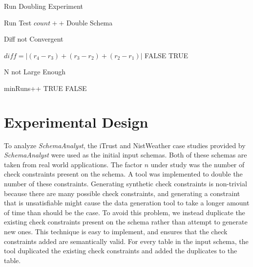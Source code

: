 \documentclass{sig-alternate}
\begin{document}
\begin{algorithm}[t]
    \caption{Run Doubling Experiment}
    \begin{algorithmic}
        \STATE Run Test
        \STATE $\mathit{count}++$
        \ENDFOR
        \STATE Double Schema
        \ENDWHILE
    \end{algorithmic}
    \label{alg:main}
  \end{algorithm}

 \begin{algorithm}[t]
    \caption{Diff not Convergent}
    \begin{algorithmic}
      \STATE $\mathit{diff} = |(r_4 - r_3) + (r_3 -r_2) + (r_2 - r_1)|$
      \RETURN FALSE
      \ELSE
      \RETURN TRUE
      \ENDIF
    \end{algorithmic}
    \label{alg:convergence}
  \end{algorithm}

 \begin{algorithm}[t]
    \caption{N not Large Enough}
    \begin{algorithmic}
      \STATE minRuns++
      \RETURN TRUE
      \ENDIF
      \ENDIF
      \RETURN FALSE
    \end{algorithmic}
    \label{alg:tuning}
  \end{algorithm}

\section{Experimental Design}
To analyze \textit{SchemaAnalyst}, the iTrust and NistWeather case
studies provided by \textit{SchemaAnalyst} were used as the initial 
input schemas.
Both of these schemas are taken from real world applications. The factor $n$
under study was the number of check constraints present on the schema.  A tool was
implemented to double the number of these constraints. Generating
synthetic check constraints is non-trivial because there are many
possible check constraints, and generating a constraint that is
unsatisfiable might cause the data generation tool to take a longer
amount of time than should be the case. To avoid this problem, we
instead duplicate the existing check constraints present on the schema
rather than attempt to generate new ones. This technique is easy
to implement, and ensures that the check constraints added are
semantically valid.  For every table in the input schema, the tool 
duplicated the existing check constraints and added the duplicates 
to the table.  
\end{document}
